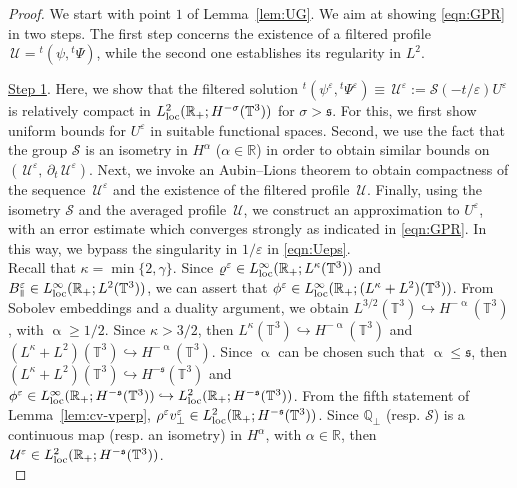 \documentclass[11pt,reqno]{amsart}
\def \R{{\mathbb{R}}}
\def \Q{{\mathbb{Q}}}
\def \T{{\mathbb{T}}}
\newcommand{\myparallel}{{\mkern3mu\vphantom{\perp}\vrule depth 0pt\mkern2mu\vrule depth 0pt\mkern3mu}}
\begin{document}
\begin{proof}
  We start with point $1$ of Lemma~\ref{lem:UG}. We aim at showing \eqref{eqn:GPR} in two steps. The first step concerns the existence of a filtered profile $\, \mathcal U={}^t(\psi, {}^t\Psi) $, while the second one establishes its regularity in $L^2$.
  
  \underline{Step 1}. Here, we show that the filtered solution ${}^t(\psi^\varepsilon, {}^t\Psi^\varepsilon) \equiv \, \mathcal U^\varepsilon:=\mathcal S(-t/\varepsilon)U^\varepsilon $ is relatively compact in $L_{\rm loc}^{2}(\R_+; H^{-\sigma}(\T^3))$ for $\sigma> \mathfrak s$. For this, we first show uniform bounds for  $U^\varepsilon$ in suitable functional spaces. Second, we use the fact that the group  $\mathcal S$ is an isometry in $H^{\alpha}$ ($\alpha\in \R$) in order to obtain similar bounds on $(\, \mathcal U^\varepsilon, \, \partial_t \, \mathcal U^\varepsilon)$. Next, we invoke an Aubin--Lions theorem to obtain compactness of the sequence $\, \mathcal U^\varepsilon$ and the existence of the filtered profile $\, \mathcal U$.  Finally, using  the isometry $\mathcal S$ and the averaged profile $\, \mathcal U$, we construct an approximation to $U^\varepsilon$, with an error estimate which converges strongly as indicated in \eqref{eqn:GPR}. In this way, we bypass the singularity in $1/\varepsilon$ in \eqref{eqn:Ueps}. \\
  Recall that $\kappa =\min\{2,\gamma\}$. Since $\varrho^\varepsilon \in L_{\rm loc}^{\infty}(\R_+; L^{\kappa}(\T^3))$ and $B_\myparallel^\varepsilon \in  L_{\rm loc}^{\infty}(\R_+; L^2(\T^3))$, we can assert that $\phi^\varepsilon \in  L_{\rm loc}^{\infty}(\R_+; (L^{\kappa}+L^2)(\T^3))$. From Sobolev embeddings and a duality argument, we obtain $L^{3/2}(\T^3) \hookrightarrow H^{-\upalpha}(\T^3)$, with $\upalpha \geq 1/2$. Since $\kappa >3/2$, then $L^{\kappa}(\T^3) \hookrightarrow H^{-\upalpha}(\T^3)$ and  $(L^{\kappa}+L^2)(\T^3) \hookrightarrow H^{-\upalpha}(\T^3)$. Since $\upalpha$ can be chosen such that $\upalpha \leq \mathfrak s$, then  $(L^{\kappa}+L^2)(\T^3) \hookrightarrow H^{-\mathfrak s}(\T^3)$ and $\phi^\varepsilon \in  L_{\rm loc}^{\infty}(\R_+; H^{-\mathfrak s}(\T^3)) \hookrightarrow  L_{\rm loc}^{2}(\R_+; H^{-\mathfrak s}(\T^3))$. From the fifth statement of Lemma~\ref{lem:cv-vperp}, $\rho^\varepsilon v_\perp^\varepsilon \in L_{\rm loc}^{2}(\R_+; H^{-\mathfrak s}(\T^3))$. Since $\Q_\perp$ (resp. $\mathcal S$) is a continuous map (resp. an isometry) in $H^{\alpha}$, with $\alpha\in \R$, then $\, \mathcal U^\varepsilon \in L_{\rm loc}^{2}(\R_+; H^{-\mathfrak s}(\T^3))$. \\

\end{proof}
\end{document}
